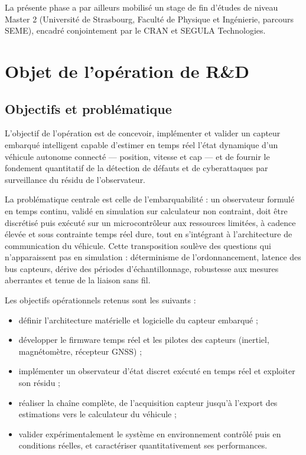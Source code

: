 \documentclass[11pt,a4paper]{article}
\begin{document}
La présente phase a par ailleurs mobilisé un stage de fin d’études de niveau Master 2 (Université de Strasbourg, Faculté de Physique et Ingénierie, parcours SEME), encadré conjointement par le CRAN et SEGULA Technologies.

\section{Objet de l’opération de R\&D}

\subsection{Objectifs et problématique}

L’objectif de l’opération est de concevoir, implémenter et valider un capteur embarqué intelligent capable d’estimer en temps réel l’état dynamique d’un véhicule autonome connecté — position, vitesse et cap — et de fournir le fondement quantitatif de la détection de défauts et de cyberattaques par surveillance du résidu de l’observateur.

La problématique centrale est celle de l’embarquabilité : un observateur formulé en temps continu, validé en simulation sur calculateur non contraint, doit être discrétisé puis exécuté sur un microcontrôleur aux ressources limitées, à cadence élevée et sous contrainte temps réel dure, tout en s’intégrant à l’architecture de communication du véhicule. Cette transposition soulève des questions qui n’apparaissent pas en simulation : déterminisme de l’ordonnancement, latence des bus capteurs, dérive des périodes d’échantillonnage, robustesse aux mesures aberrantes et tenue de la liaison sans fil.

Les objectifs opérationnels retenus sont les suivants :

\begin{itemize}
\item définir l’architecture matérielle et logicielle du capteur embarqué ;
\item développer le firmware temps réel et les pilotes des capteurs (inertiel, magnétomètre, récepteur GNSS) ;
\item implémenter un observateur d’état discret exécuté en temps réel et exploiter son résidu ;
\item réaliser la chaîne complète, de l’acquisition capteur jusqu’à l’export des estimations vers le calculateur du véhicule ;
\item valider expérimentalement le système en environnement contrôlé puis en conditions réelles, et caractériser quantitativement ses performances.
\end{itemize}
\end{document}
